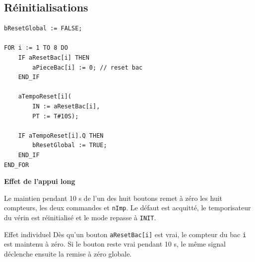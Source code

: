 
\noindent
\begin{minipage}[t]{0.355\textwidth}\vspace{0pt}
  \subsection{Réinitialisations}
\begin{lstlisting}[style=stcode]
bResetGlobal := FALSE;

FOR i := 1 TO 8 DO
    IF aResetBac[i] THEN
        aPieceBac[i] := 0; // reset bac
    END_IF

    aTempoReset[i](
        IN := aResetBac[i],
        PT := T#10S);

    IF aTempoReset[i].Q THEN
        bResetGlobal := TRUE;
    END_IF
END_FOR
\end{lstlisting}

  \begin{primarycard}
    \textbf{Effet de l'appui long}\par\small
    Le maintien pendant 10 s de l'un des huit boutons remet à zéro les huit compteurs, les deux commandes et \texttt{nImp}. Le défaut est acquitté, le temporisateur du vérin est réinitialisé et le mode repasse à \texttt{INIT}.
  \end{primarycard}
  \begin{notebox}{Effet individuel}
    Dès qu'un bouton \texttt{aResetBac[i]} est vrai, le compteur du bac \texttt{i} est maintenu à zéro. Si le bouton reste vrai pendant 10 s, le même signal déclenche ensuite la remise à zéro globale.
  \end{notebox}
\end{minipage}\hfill
